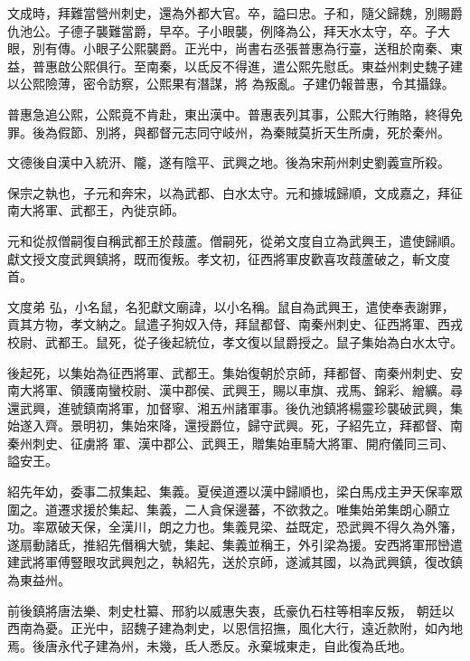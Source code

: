 \begin{pinyinscope}
 文成時，拜難當營州刺史，還為外都大官。卒，謚曰忠。子和，隨父歸魏，別賜爵仇池公。子德子襲難當爵，早卒。子小眼襲，例降為公，拜天水太守，卒。子大眼，別有傳。小眼子公熙襲爵。正光中，尚書右丞張普惠為行臺，送租於南秦、東益，普惠啟公熙俱行。至南秦，以氐反不得進，遣公熙先慰氐。東益州刺史魏子建以公熙險薄，密令訪察，公熙果有潛謀，將
 為叛亂。子建仍報普惠，令其攝錄。



 普惠急追公熙，公熙竟不肯赴，東出漢中。普惠表列其事，公熙大行賄賂，終得免罪。後為假節、別將，與都督元志同守岐州，為秦賊莫折天生所虜，死於秦州。



 文德後自漢中入統汧、隴，遂有陰平、武興之地。後為宋荊州刺史劉義宣所殺。



 保宗之執也，子元和奔宋，以為武都、白水太守。元和據城歸順，文成嘉之，拜征南大將軍、武都王，內徙京師。



 元和從叔僧嗣復自稱武都王於葭蘆。僧嗣死，從弟文度自立為武興王，遣使歸順。獻文授文度武興鎮將，既而復叛。孝文初，征西將軍皮歡喜攻葭蘆破之，斬文度首。



 文度弟
 弘，小名鼠，名犯獻文廟諱，以小名稱。鼠自為武興王，遣使奉表謝罪，貢其方物，孝文納之。鼠遣子狗奴入侍，拜鼠都督、南秦州刺史、征西將軍、西戎校尉、武都王。鼠死，從子後起統位，孝文復以鼠爵授之。鼠子集始為白水太守。



 後起死，以集始為征西將軍、武都王。集始復朝於京師，拜都督、南秦州刺史、安南大將軍、領護南蠻校尉、漢中郡侯、武興王，賜以車旗、戎馬、錦彩、繒纊。尋還武興，進號鎮南將軍，加督寧、湘五州諸軍事。後仇池鎮將楊靈珍襲破武興，集始遂入齊。景明初，集始來降，還授爵位，歸守武興。死，子紹先立，拜都督、南秦州刺史、征虜將
 軍、漢中郡公、武興王，贈集始車騎大將軍、開府儀同三司、謚安王。



 紹先年幼，委事二叔集起、集義。夏侯道遷以漢中歸順也，梁白馬戍主尹天保率眾圍之。道遷求援於集起、集義，二人貪保邊蕃，不欲救之。唯集始弟集朗心願立功。率眾破天保，全漢川，朗之力也。集義見梁、益既定，恐武興不得久為外籓，遂扇動諸氐，推紹先僭稱大號，集起、集義並稱王，外引梁為援。安西將軍邢巒遣建武將軍傅豎眼攻武興剋之，執紹先，送於京師，遂滅其國，以為武興鎮，復改鎮為東益州。



 前後鎮將唐法樂、刺史杜纂、邢豹以威惠失衷，氐豪仇石柱等相率反叛，
 朝廷以西南為憂。正光中，詔魏子建為刺史，以恩信招撫，風化大行，遠近款附，如內地焉。後唐永代子建為州，未幾，氐人悉反。永棄城東走，自此復為氐地。




\end{pinyinscope}
